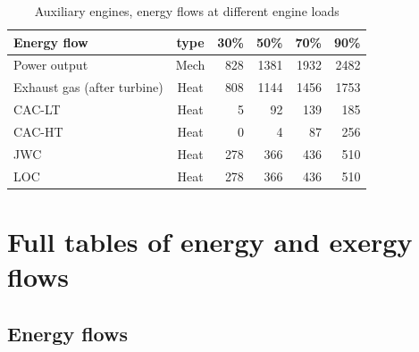\documentclass[preprint,12pt]{elsarticle}
\begin{document}
\begin{table}
	\small
	\centering
	\begin{tabular}{lcrrrr}
		\hline
		Energy flow & type & 30\% & 50\% & 70\% & 90\% \\
		\hline
		Power output & Mech & 828 & 1381 & 1932 & 2482 \\
		
		Exhaust gas (after turbine) & Heat & 808 & 1144 & 1456 & 1753 \\
		CAC-LT & Heat & 5 & 92 & 139 & 185 \\
		CAC-HT & Heat & 0 & 4 & 87 & 256  \\
		JWC & Heat & 278 & 366 & 436 & 510 \\ 
		LOC & Heat & 278 & 366 & 436 & 510 \\ 
		\hline
	\end{tabular}
	\caption{Auxiliary engines, energy flows at different engine loads}
	\label{tab:AE_flows}
\end{table}

\clearpage



\section{Full tables of energy and exergy flows} \label{sec:appendix:energy}

\subsection{Energy flows}
\end{document}
